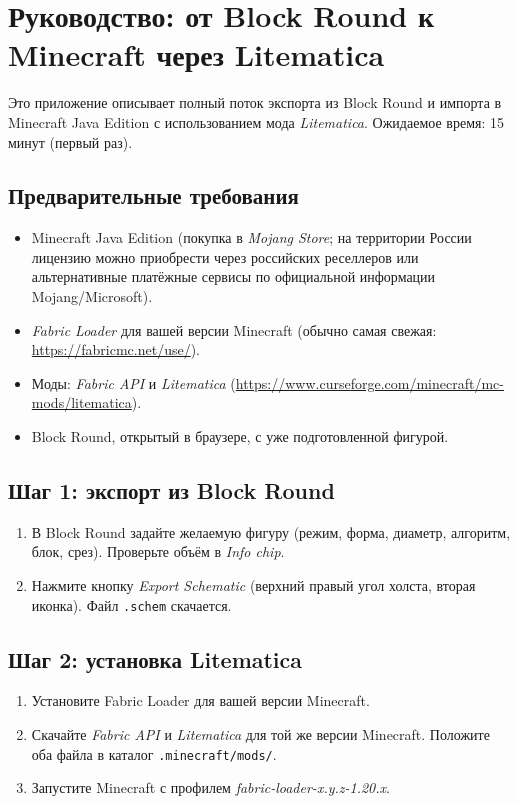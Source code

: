 \documentclass[12pt,a4paper]{scrartcl}
\begin{document}
\newpage
\section{Руководство: от Block Round к Minecraft через Litematica}\label{ap:litematica}

Это приложение описывает полный поток экспорта из Block Round и импорта в Minecraft Java Edition с использованием мода \emph{Litematica}. Ожидаемое время: 15 минут (первый раз).

\subsection{Предварительные требования}
\begin{itemize}[leftmargin=1.3em,itemsep=0.1em,topsep=0.2em,nosep]
  \item Minecraft Java Edition (покупка в \emph{Mojang Store}; на территории России лицензию можно приобрести через российских реселлеров или альтернативные платёжные сервисы по официальной информации Mojang/Microsoft).
  \item \emph{Fabric Loader} для вашей версии Minecraft (обычно самая свежая: \url{https://fabricmc.net/use/}).
  \item Моды: \emph{Fabric API} и \emph{Litematica} (\url{https://www.curseforge.com/minecraft/mc-mods/litematica}).
  \item Block Round, открытый в браузере, с уже подготовленной фигурой.
\end{itemize}

\subsection{Шаг 1: экспорт из Block Round}
\begin{enumerate}[leftmargin=1.5em,itemsep=0.15em,topsep=0.3em]
  \item В Block Round задайте желаемую фигуру (режим, форма, диаметр, алгоритм, блок, срез). Проверьте объём в \emph{Info chip}.
  \item Нажмите кнопку \emph{Export Schematic} (верхний правый угол холста, вторая иконка). Файл \texttt{.schem} скачается.
\end{enumerate}

\subsection{Шаг 2: установка Litematica}
\begin{enumerate}[leftmargin=1.5em,itemsep=0.15em,topsep=0.3em]
  \item Установите Fabric Loader для вашей версии Minecraft.
  \item Скачайте \emph{Fabric API} и \emph{Litematica} для той же версии Minecraft. Положите оба файла в каталог \texttt{.minecraft/mods/}.
  \item Запустите Minecraft с профилем \emph{fabric-loader-x.y.z-1.20.x}.
\end{enumerate}
\end{document}
